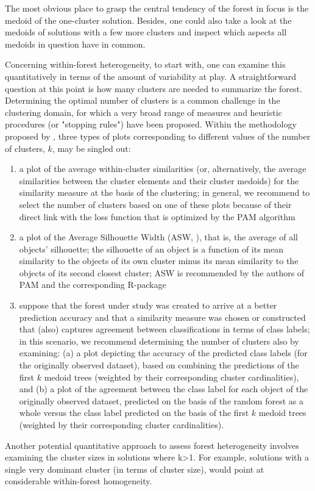 The most obvious place to grasp the central tendency of the forest in focus is the medoid of the one-cluster solution. Besides, one could also take a look at the medoids of solutions with a few more clusters and inspect which aspects all medoids in question have in common. 

Concerning within-forest heterogeneity, to start with, one can examine this quantitatively in terms of the amount of variability at play. A straightforward question at this point is how many clusters are needed to summarize the forest. Determining the optimal number of clusters is a common challenge in the clustering domain, for which a very broad range of measures and heuristic procedures (or "stopping rules") have been proposed. Within the methodology proposed by \citet{Sies2020}, three types of plots corresponding to different values of the number of clusters, $k$, may be singled out:
\begin{enumerate}
	\item a plot of the average within-cluster similarities (or, alternatively, the average similarities between the cluster elements and their cluster medoids) for the similarity measure at the basis of the clustering; in general, we recommend to select the number of clusters based on one of these plots because of their direct link with the loss function that is optimized by the PAM algorithm
	\item a plot of the Average Silhouette Width (ASW, \citep{Rousseeuw1987}), that is, the average of all objects' silhouette; the silhouette of an object is a function of its mean similarity to the objects of its own cluster minus its mean similarity to the objects of its second closest cluster; ASW is recommended by the authors of PAM and the corresponding R-package \citep{Kaufman2009, Maechler2019}
	\item  suppose that the forest under study was created to arrive at a better prediction accuracy and that a similarity measure was chosen or constructed that (also) captures agreement between classifications in terms of class labels; in this scenario, we recommend determining the number of clusters also by examining: (a) a plot depicting the accuracy of the predicted class labels (for the originally observed dataset), based on combining the predictions of the first $k$ medoid trees (weighted by their corresponding cluster cardinalities), and (b) a plot of the agreement between the class label for each object of the originally observed dataset, predicted on the basis of the random forest as a whole versus the class label predicted on the basis of the first $k$ medoid trees (weighted by their corresponding cluster cardinalities). \end{enumerate}
Another potential quantitative approach to assess forest heterogeneity involves examining the cluster sizes in solutions where k>1. For example, solutions with a single very dominant cluster (in terms of cluster size), would point at considerable within-forest homogeneity.

